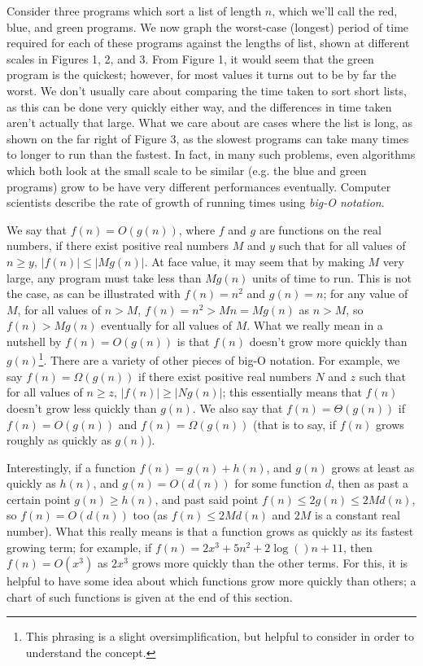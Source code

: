\documentclass[12pt,a4paper]{report}
\begin{document}
\begin{multicols}{2}

Consider three programs which sort a list of length \(n\), which we'll call the red, blue, and green programs. We now graph the worst-case (longest) period of time required for each of these programs against the lengths of list, shown at different scales in Figures 1, 2, and 3. From Figure 1, it would seem that the green program is the quickest; however, for most values it turns out to be by far the worst. We don't usually care about comparing the time taken to sort short lists, as this can be done very quickly either way, and the differences in time taken aren't actually that large. What we care about are cases where the list is long, as shown on the far right of Figure 3, as the slowest programs can take many times to longer to run than the fastest. In fact, in many such problems, even algorithms which both look at the small scale to be similar (e.g. the blue and green programs) grow to be have very different performances eventually. Computer scientists describe the rate of growth of running times using \textit{big-O notation}.

We say that \(f(n)=O(g(n))\), where \(f\) and \(g\) are functions on the real numbers, if there exist positive real numbers \(M\) and \(y\) such that for all values of \(n \geq{} y\), \(|f(n)|\leq{}|Mg(n)|\). At face value, it may seem that by making \(M\) very large, any program must take less than \(Mg(n)\) units of time to run. This is not the case, as can be illustrated with \(f(n)=n^2\) and \(g(n)=n\); for any value of \(M\), for all values of \(n>M\), \(f(n)=n^2>Mn=Mg(n)\) as \(n>M\), so \(f(n)>Mg(n)\) eventually for all values of \(M\). What we really mean in a nutshell by \(f(n)=O(g(n))\) is that \(f(n)\) doesn't grow more quickly than \(g(n)\)\footnote{This phrasing is a slight oversimplification, but helpful to consider in order to understand the concept.}. There are a variety of other pieces of big-O notation. For example, we say \(f(n)=\Omega(g(n))\) if there exist positive real numbers \(N\) and \(z\) such that for all values of \(n \geq{} z\), \(|f(n)|\geq{}|Ng(n)|\); this essentially means that \(f(n)\) doesn't grow less quickly than \(g(n)\)\footnotemark[\value{footnote}]. We also say that \(f(n)=\Theta(g(n))\) if \(f(n)=O(g(n))\) and \(f(n)=\Omega(g(n))\) (that is to say, if \(f(n)\) grows roughly as quickly as \(g(n)\)\footnotemark[\value{footnote}]).

Interestingly, if a function \(f(n)=g(n)+h(n)\), and \(g(n)\) grows at least as quickly as \(h(n)\), and \(g(n)=O(d(n))\) for some function \(d\), then as past a certain point \(g(n)\geq{}h(n)\), and past said point \(f(n)\leq{}2g(n)\leq2Md(n)\), so \(f(n)=O(d(n))\) too (as \(f(n)\leq{}2Md(n)\) and \(2M\) is a constant real number). What this really means is that a function grows as quickly as its fastest growing term; for example, if \(f(n)=2x^3 + 5n^2 + 2\log()n + 11\), then \(f(n)=O(x^3)\) as \(2x^3\) grows more quickly than the other terms. For this, it is helpful to have some idea about which functions grow more quickly than others; a chart of such functions is given at the end of this section.


\end{multicols}
\end{document}
